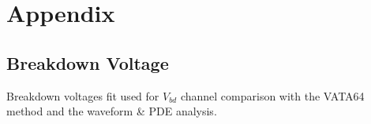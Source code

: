 \chapter{Appendix}




\section{Breakdown Voltage}
Breakdown voltages fit used for $V_{bd}$ channel comparison with the VATA64 method and the waveform \& PDE analysis. 
